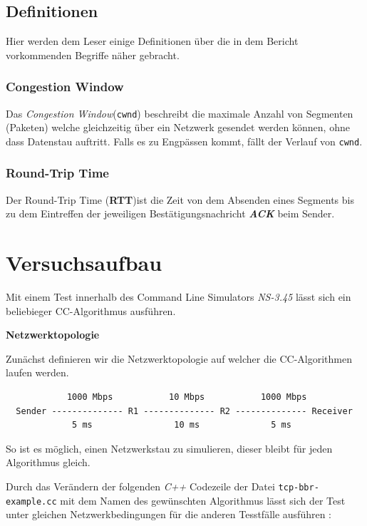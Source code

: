 \documentclass[paper=a4,fontsize=12pt,ngerman]{scrartcl}
\begin{document}
\subsection{Definitionen}
Hier werden dem Leser einige Definitionen über die in dem Bericht vorkommenden Begriffe näher gebracht.

\subsubsection{Congestion Window} \label{cw-def}
Das \textit{Congestion Window}(\texttt{cwnd}) beschreibt die maximale Anzahl von Segmenten (Paketen) welche gleichzeitig über ein Netzwerk gesendet werden können, ohne 
dass Datenstau auftritt. Falls es zu Engpässen kommt, fällt der Verlauf von \texttt{cwnd}.

\subsubsection{Round-Trip Time} \label{rtt-def}

Der Round-Trip Time (\textbf{RTT})ist die Zeit von dem Absenden eines Segments bis zu dem Eintreffen der jeweiligen Bestätigungsnachricht \textit{\textbf{ACK}} beim Sender.



\clearpage
\section{Versuchsaufbau}

Mit einem Test innerhalb des Command Line Simulators \textit{NS-3.45}\cite{ns3-simu} lässt sich ein beliebieger CC-Algorithmus ausführen.


\textbf{Netzwerktopologie}

Zunächst definieren wir die Netzwerktopologie auf welcher die CC-Algorithmen
laufen werden.\cite{ns3BBR}
\small
\begin{verbatim}
            1000 Mbps           10 Mbps           1000 Mbps
  Sender -------------- R1 -------------- R2 -------------- Receiver
             5 ms                10 ms              5 ms
\end{verbatim}
So ist es möglich, einen Netzwerkstau zu simulieren, dieser bleibt für jeden Algorithmus gleich.

Durch das Verändern der folgenden \textit{C++} Codezeile der Datei \verb|tcp-bbr-example.cc| mit dem Namen des gewünschten Algorithmus lässt sich der Test unter gleichen Netzwerkbedingungen für die anderen Tesstfälle ausführen :
\end{document}
